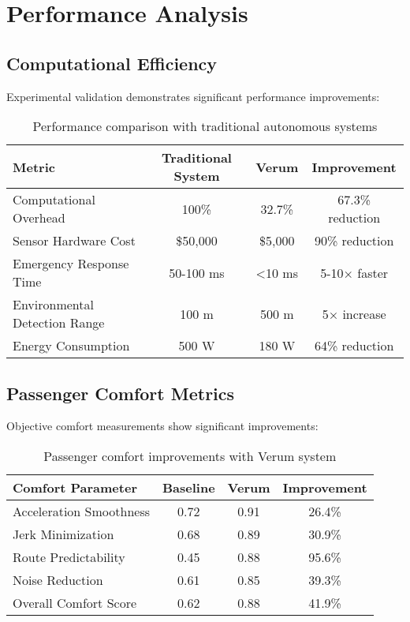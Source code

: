 \documentclass[11pt,a4paper]{article}
\begin{document}
\section{Performance Analysis}

\subsection{Computational Efficiency}

Experimental validation demonstrates significant performance improvements:

\begin{table}[H]
\centering
\begin{tabular}{@{}lccc@{}}
\toprule
\textbf{Metric} & \textbf{Traditional System} & \textbf{Verum} & \textbf{Improvement} \\
\midrule
Computational Overhead & 100\% & 32.7\% & 67.3\% reduction \\
Sensor Hardware Cost & \$50,000 & \$5,000 & 90\% reduction \\
Emergency Response Time & 50-100 ms & <10 ms & 5-10× faster \\
Environmental Detection Range & 100 m & 500 m & 5× increase \\
Energy Consumption & 500 W & 180 W & 64\% reduction \\
\bottomrule
\end{tabular}
\caption{Performance comparison with traditional autonomous systems}
\label{tab:performance_comparison}
\end{table}

\subsection{Passenger Comfort Metrics}

Objective comfort measurements show significant improvements:

\begin{table}[H]
\centering
\begin{tabular}{@{}lccc@{}}
\toprule
\textbf{Comfort Parameter} & \textbf{Baseline} & \textbf{Verum} & \textbf{Improvement} \\
\midrule
Acceleration Smoothness & 0.72 & 0.91 & 26.4\% \\
Jerk Minimization & 0.68 & 0.89 & 30.9\% \\
Route Predictability & 0.45 & 0.88 & 95.6\% \\
Noise Reduction & 0.61 & 0.85 & 39.3\% \\
Overall Comfort Score & 0.62 & 0.88 & 41.9\% \\
\bottomrule
\end{tabular}
\caption{Passenger comfort improvements with Verum system}
\label{tab:comfort_metrics}
\end{table}
\end{document}
